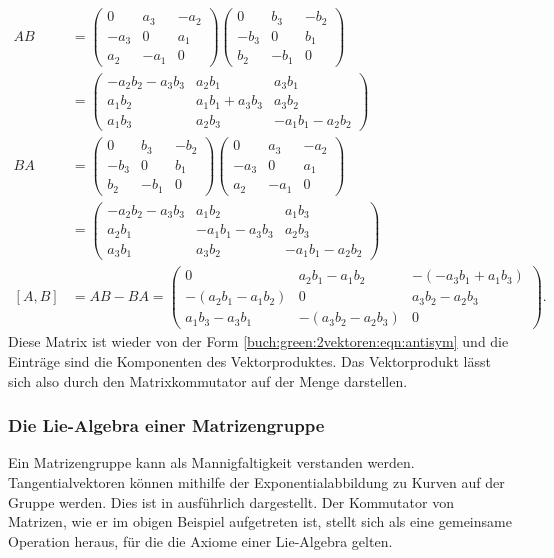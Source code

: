 \begin{align*}
AB
&=
\begin{pmatrix}
  0  &  a_3 & -a_2 \\
-a_3 &   0  &  a_1 \\
 a_2 & -a_1 &   0
\end{pmatrix}
\begin{pmatrix}
  0  &  b_3 & -b_2 \\
-b_3 &   0  &  b_1 \\
 b_2 & -b_1 &   0
\end{pmatrix}
\\
&=
\begin{pmatrix}
-a_2b_2-a_3b_3 &     a_2b_1     & a_3b_1         \\
 a_1b_2        & a_1b_1+a_3b_3  & a_3b_2         \\
 a_1b_3        &     a_2b_3     & -a_1b_1-a_2b_2 
\end{pmatrix}
\\
BA
&=
\begin{pmatrix}
  0  &  b_3 & -b_2 \\
-b_3 &   0  &  b_1 \\
 b_2 & -b_1 &   0
\end{pmatrix}
\begin{pmatrix}
  0  &  a_3 & -a_2 \\
-a_3 &   0  &  a_1 \\
 a_2 & -a_1 &   0
\end{pmatrix}
\\
&=
\begin{pmatrix}
-a_2b_2-a_3b_3  &      a_1b_2    &    a_1b_3     \\
     a_2b_1     & -a_1b_1-a_3b_3 &    a_2b_3     \\
     a_3b_1     &      a_3b_2    & -a_1b_1-a_2b_2
\end{pmatrix}
\\
[A,B]
&=
AB-BA
=
\begin{pmatrix}
        0        &   a_2b_1-a_1b_2  & -(-a_3b_1+a_1b_3) \\
-(a_2b_1-a_1b_2) &         0        &    a_3b_2-a_2b_3  \\
  a_1b_3-a_3b_1  & -(a_3b_2-a_2b_3) &          0
\end{pmatrix}.
\end{align*}
Diese Matrix ist wieder von der Form 
\eqref{buch:green:2vektoren:eqn:antisym}
und die Einträge sind die Komponenten des Vektorproduktes.
Das Vektorprodukt lässt sich also durch den Matrixkommutator
auf der Menge darstellen.

%
%
\subsubsection{Die Lie-Algebra einer Matrizengruppe}
Ein Matrizengruppe kann als Mannigfaltigkeit verstanden werden.
Tangentialvektoren können mithilfe der Exponentialabbildung zu
Kurven auf der Gruppe werden.
Dies ist in \cite[Abschnitt 9.4]{buch:linalg} ausführlich dargestellt.
Der Kommutator von Matrizen, wie er im obigen Beispiel aufgetreten
ist, stellt sich als eine gemeinsame Operation heraus, für die die
Axiome einer Lie-Algebra gelten.

